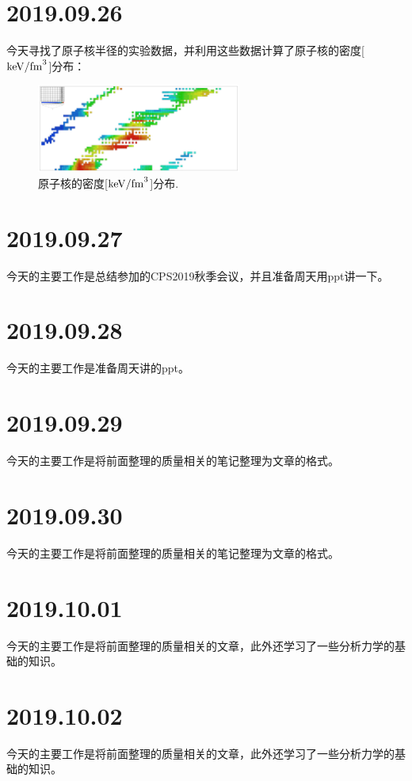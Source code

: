 \section{2019.09.26}
今天寻找了原子核半径的实验数据，并利用这些数据计算了原子核的密度[${\rm keV/fm}^3$]分布：
\begin{figure}[H]
\centering
\includegraphics[width=0.6\textwidth]{figure/density.pdf}
\caption{原子核的密度[${\rm keV/fm}^3$]分布.\label{fig_density}}
\end{figure}

\section{2019.09.27}
今天的主要工作是总结参加的CPS2019秋季会议，并且准备周天用ppt讲一下。

\section{2019.09.28}
今天的主要工作是准备周天讲的ppt。

\section{2019.09.29}
今天的主要工作是将前面整理的质量相关的笔记整理为文章的格式。

\section{2019.09.30}
今天的主要工作是将前面整理的质量相关的笔记整理为文章的格式。

\section{2019.10.01}
今天的主要工作是将前面整理的质量相关的文章，此外还学习了一些分析力学的基础的知识。

\section{2019.10.02}
今天的主要工作是将前面整理的质量相关的文章，此外还学习了一些分析力学的基础的知识。

